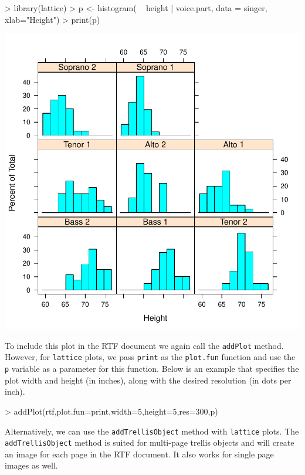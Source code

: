 \documentclass[11pt,letterpaper]{article}
\begin{document}
\begin{Schunk}
\begin{Sinput}
> library(lattice)
> p <- histogram( ~ height | voice.part, data = singer, xlab="Height")
> print(p)
\end{Sinput}
\end{Schunk}
\includegraphics{rtf-023}

To include this plot in the RTF document we again call the \texttt{addPlot} method.  However, for \texttt{lattice} plots, we pass \texttt{print} as the \texttt{plot.fun} function and use the \texttt{p} variable as a parameter for this function.  Below is an example that specifies the plot width and height (in inches), along with the desired resolution (in dots per inch).

\begin{Schunk}
\begin{Sinput}
> addPlot(rtf,plot.fun=print,width=5,height=5,res=300,p)
\end{Sinput}
\end{Schunk}


Alternatively, we can use the \texttt{addTrellisObject} method with \texttt{lattice} plots.  The \texttt{addTrellisObject} method is suited for multi-page trellis objects and will create an image for each page in the RTF document.  It also works for single page images as well.
\end{document}
